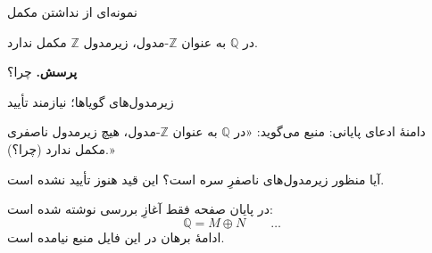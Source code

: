 \begin{frame}[t]{نمونه‌ای از نداشتن مکمل}
    \label{lec05:integers-no-complement}
    \begin{example}
        در $\mathbb{Q}$ به عنوان $\mathbb{Z}$-مدول،
        زیرمدول $\mathbb{Z}$ مکمل ندارد.
    \end{example}
    \textbf{پرسش.} چرا؟
\end{frame}

\begin{frame}[t]{زیرمدول‌های گویاها؛ نیازمند تأیید}
    \label{lec05:rationals-complement-pending}
    \begin{alertblock}{دامنهٔ ادعای پایانی: }
        منبع می‌گوید: «در $\mathbb{Q}$ به عنوان $\mathbb{Z}$-مدول،
        هیچ زیرمدول ناصفری مکمل ندارد (چرا؟).»

        آیا منظور زیرمدول‌های ناصفرِ \alert{سره} است؟
        این قید هنوز تأیید نشده است.
    \end{alertblock}
    در پایان صفحه فقط آغازِ بررسی نوشته شده است:
    \[
        \mathbb{Q}=M\oplus N\qquad\ldots
    \]
    ادامهٔ برهان در این فایل منبع نیامده است.
\end{frame}
